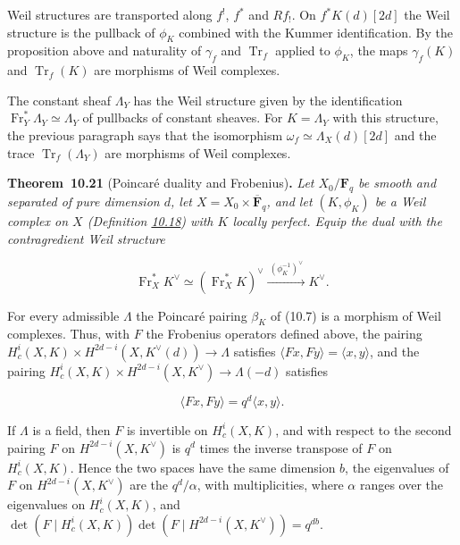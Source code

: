 \documentclass[11pt]{article}
\newenvironment{bpstatement}[2]{\par\addvspace{0.6\baselineskip}\noindent\textbf{#1}#2\textbf{.}\enspace\ignorespaces}
  {\par\addvspace{0.4\baselineskip}}
\newenvironment{bpstatementit}[2]{\begin{bpstatement}{#1}{#2}\itshape\ignorespaces}{\end{bpstatement}}
\begin{document}
\label{bp64}%
Weil structures are transported along \(f^!\), \(f^*\) and \(Rf_!\). On \(f^*K(d)[2d]\) the Weil structure is the pullback of \(\phi_K\) combined with the Kummer identification. By the proposition above and naturality of \(\gamma_f\) and \(\operatorname{Tr}_f\) applied to \(\phi_K\), the maps \(\gamma_f(K)\) and \(\operatorname{Tr}_f(K)\) are morphisms of Weil complexes.

The constant sheaf \(\Lambda_Y\) has the Weil structure given by the identification \(\operatorname{Fr}_Y^*\Lambda_Y\simeq\Lambda_Y\) of pullbacks of constant sheaves. For \(K=\Lambda_Y\) with this structure, the previous paragraph says that the isomorphism \(\omega_f\simeq\Lambda_X(d)[2d]\) and the trace \(\operatorname{Tr}_f(\Lambda_Y)\) are morphisms of Weil complexes.

\label{bp65}%
\begin{bpstatementit}{Theorem~10.21}{ (Poincaré duality and Frobenius)}
Let \(X_0/\mathbf F_q\) be smooth and separated of pure dimension \(d\), let \(X=X_0\times\overline{\mathbf F}_q\), and let \((K,\phi_K)\) be a Weil complex on \(X\) (Definition \hyperref[bp56]{10.18}) with \(K\) locally perfect. Equip the dual with the contragredient Weil structure

\[
\operatorname{Fr}_X^*K^\vee
\simeq(\operatorname{Fr}_X^*K)^\vee
\xrightarrow{\ (\phi_K^{-1})^\vee\ }K^\vee.
\]

For every admissible \(\Lambda\) the Poincaré pairing \(\beta_K\) of (10.7) is a morphism of Weil complexes. Thus, with \(F\) the Frobenius operators defined above, the pairing \(H^i_c(X,K)\times H^{2d-i}(X,K^\vee(d))\to\Lambda\) satisfies \(\langle Fx,Fy\rangle=\langle x,y\rangle\), and the pairing \(H^i_c(X,K)\times H^{2d-i}(X,K^\vee)\to\Lambda(-d)\) satisfies

\[
\langle Fx,Fy\rangle=q^d\langle x,y\rangle.
\]

If \(\Lambda\) is a field, then \(F\) is invertible on \(H^i_c(X,K)\), and with respect to the second pairing \(F\) on \(H^{2d-i}(X,K^\vee)\) is \(q^d\) times the inverse transpose of \(F\) on \(H^i_c(X,K)\). Hence the two spaces have the same dimension \(b\), the eigenvalues of \(F\) on \(H^{2d-i}(X,K^\vee)\) are the \(q^d/\alpha\), with multiplicities, where \(\alpha\) ranges over the eigenvalues on \(H^i_c(X,K)\), and \(\det(F\mid H^i_c(X,K))\det(F\mid H^{2d-i}(X,K^\vee))=q^{db}\).
\end{bpstatementit}
\end{document}
